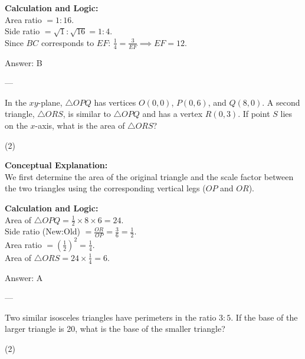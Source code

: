 \documentclass[11pt,paper=a4,answers]{exam}
\begin{document}
\begin{questions}
\begin{solution}
\vspace{10pt}
\textbf{Calculation and Logic:} \\
Area ratio $= 1:16$. \\
Side ratio $= \sqrt{1} : \sqrt{16} = 1:4$. \\
Since $BC$ corresponds to $EF$: $\frac{1}{4} = \frac{3}{EF} \implies EF = 12$.

\vspace{15pt}
Answer: \colorbox{yellow!100}{B}
\end{solution}

---

\question
In the $xy$-plane, $\triangle OPQ$ has vertices $O(0,0)$, $P(0,6)$, and $Q(8,0)$. A second triangle, $\triangle ORS$, is similar to $\triangle OPQ$ and has a vertex $R(0,3)$. If point $S$ lies on the $x$-axis, what is the area of $\triangle ORS$?
\begin{tasks}(2)
\end{tasks}

\begin{solution}
\textbf{Conceptual Explanation:} \\
We first determine the area of the original triangle and the scale factor between the two triangles using the corresponding vertical legs ($OP$ and $OR$).

\vspace{10pt}
\textbf{Calculation and Logic:} \\
Area of $\triangle OPQ = \frac{1}{2} \times 8 \times 6 = 24$. \\
Side ratio (New:Old) $= \frac{OR}{OP} = \frac{3}{6} = \frac{1}{2}$. \\
Area ratio $= (\frac{1}{2})^2 = \frac{1}{4}$. \\
Area of $\triangle ORS = 24 \times \frac{1}{4} = 6$.

\vspace{15pt}
Answer: \colorbox{yellow!100}{A}
\end{solution}

---

\question
Two similar isosceles triangles have perimeters in the ratio $3:5$. If the base of the larger triangle is 20, what is the base of the smaller triangle?
\begin{tasks}(2)
\end{tasks}


\end{questions}
\end{document}
